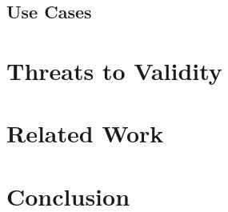 \documentclass[sigconf,review]{acmart}
\begin{document}
\subsection{Use Cases}





\section{Threats to Validity}

\section{Related Work}

\section{Conclusion}


%
\end{document}
